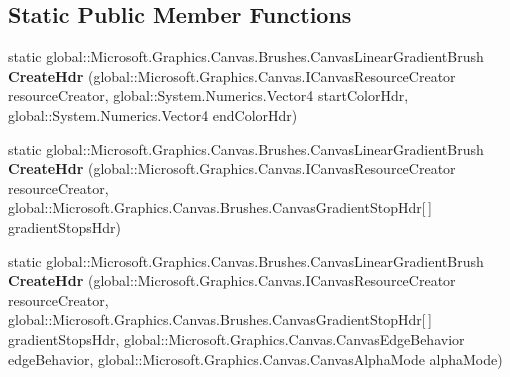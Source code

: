 \subsection*{Static Public Member Functions}
\begin{DoxyCompactItemize}
\item 
\mbox{\label{class_microsoft_1_1_graphics_1_1_canvas_1_1_brushes_1_1_canvas_linear_gradient_brush_a1164597be8c9b0ac875ac18fdb1f8965}} 
static global\+::\+Microsoft.\+Graphics.\+Canvas.\+Brushes.\+Canvas\+Linear\+Gradient\+Brush {\bfseries Create\+Hdr} (global\+::\+Microsoft.\+Graphics.\+Canvas.\+I\+Canvas\+Resource\+Creator resource\+Creator, global\+::\+System.\+Numerics.\+Vector4 start\+Color\+Hdr, global\+::\+System.\+Numerics.\+Vector4 end\+Color\+Hdr)
\item 
\mbox{\label{class_microsoft_1_1_graphics_1_1_canvas_1_1_brushes_1_1_canvas_linear_gradient_brush_a5aac477d60f1a54fac610c89d85f7c46}} 
static global\+::\+Microsoft.\+Graphics.\+Canvas.\+Brushes.\+Canvas\+Linear\+Gradient\+Brush {\bfseries Create\+Hdr} (global\+::\+Microsoft.\+Graphics.\+Canvas.\+I\+Canvas\+Resource\+Creator resource\+Creator, global\+::\+Microsoft.\+Graphics.\+Canvas.\+Brushes.\+Canvas\+Gradient\+Stop\+Hdr\mbox{[}$\,$\mbox{]} gradient\+Stops\+Hdr)
\item 
\mbox{\label{class_microsoft_1_1_graphics_1_1_canvas_1_1_brushes_1_1_canvas_linear_gradient_brush_a1a0104bd1c67e8ce9f314d0238d4aca4}} 
static global\+::\+Microsoft.\+Graphics.\+Canvas.\+Brushes.\+Canvas\+Linear\+Gradient\+Brush {\bfseries Create\+Hdr} (global\+::\+Microsoft.\+Graphics.\+Canvas.\+I\+Canvas\+Resource\+Creator resource\+Creator, global\+::\+Microsoft.\+Graphics.\+Canvas.\+Brushes.\+Canvas\+Gradient\+Stop\+Hdr\mbox{[}$\,$\mbox{]} gradient\+Stops\+Hdr, global\+::\+Microsoft.\+Graphics.\+Canvas.\+Canvas\+Edge\+Behavior edge\+Behavior, global\+::\+Microsoft.\+Graphics.\+Canvas.\+Canvas\+Alpha\+Mode alpha\+Mode)
\item 
\mbox{\label{class_microsoft_1_1_graphics_1_1_canvas_1_1_brushes_1_1_canvas_linear_gradient_brush_a0c6d262a63d8d21f04c1bb8c01fb6ac4}} 

\end{DoxyCompactItemize}
